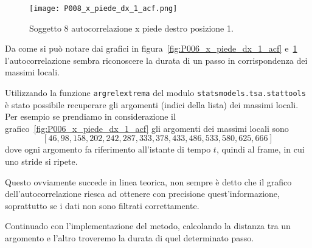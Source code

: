 \begin{figure}[H]
    \centering
    \texttt{[image: P008\_x\_piede\_dx\_1\_acf.png]}
    \caption{Soggetto $8$ autocorrelazione x piede destro posizione 1.}
    \label{fig:P008_x_piede_dx_1_acf}
\end{figure}

Da come si può notare dai grafici in figura~\ref{fig:P006_x_piede_dx_1_acf} e~\ref{fig:P008_x_piede_dx_1_acf}
l'autocorrelazione sembra riconoscere la durata di un passo in corrispondenza dei massimi locali.

Utilizzando la funzione \texttt{argrelextrema} del modulo \texttt{statsmodels.tsa.stattools}
è stato possibile recuperare gli argomenti (indici della lista) dei massimi locali.
Per esempio se prendiamo in considerazione il grafico~\ref{fig:P006_x_piede_dx_1_acf} gli argomenti
dei massimi locali sono
\[ [46, 98, 158, 202, 242, 287, 333, 378, 433, 486, 533, 580, 625, 666] \]
dove ogni argomento fa riferimento all'istante di tempo $t$, quindi al frame, in cui uno stride si ripete.

Questo ovviamente succede in linea teorica, non sempre è detto che il grafico dell'autocorrelazione
riesca ad ottenere con precisione quest'informazione, soprattutto se i dati non sono filtrati correttamente.

Continuado con l'implementazione del metodo, calcolando la distanza tra un argomento e l'altro troveremo
la durata di quel determinato passo.